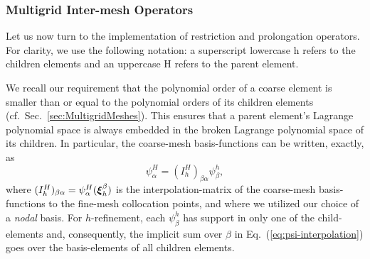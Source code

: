 \subsubsection{Multigrid Inter-mesh Operators}


Let us now turn to the implementation of restriction and prolongation operators.
For clarity, we use the
following notation: a superscript lowercase h refers to the children
elements and an uppercase H refers to the parent element.

We recall our requirement that the polynomial order of a coarse element is smaller than or equal to the polynomial orders of its children elements (cf.~Sec.~\ref{sec:MultigridMeshes}).
This ensures that a parent element's Lagrange
polynomial space is always embedded in the broken Lagrange polynomial space of
its children. In particular, the coarse-mesh basis-functions can be written, exactly, as
\begin{equation}\label{eq:psi-interpolation}
  \psi_\alpha^{H}=(I_{h}^{H})_{\beta\alpha}\psi_\beta^{h},
\end{equation}
where $(I_{h}^{H})_{\beta\alpha}=\psi_\alpha^H(\boldsymbol{\xi}^\beta_h)$ is the interpolation-matrix
of the coarse-mesh basis-functions to the fine-mesh collocation
points, and where we utilized our choice of a \emph{nodal} basis.
For
$h$-refinement, each $\psi_\beta^{h}$ has support in only one of the
child-elements and, consequently, the implicit sum over $\beta$ in
Eq.~(\ref{eq:psi-interpolation}) goes over the basis-elements of all
children elements.

